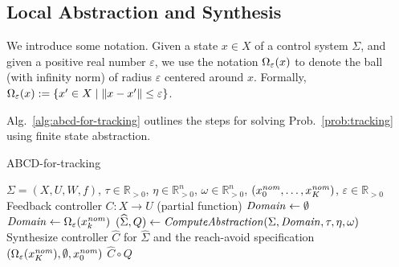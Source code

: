 \subsection{Local Abstraction and Synthesis}

We introduce some notation.
Given a state $x\in X$ of a control system $\Sigma$, and given a positive real number $\varepsilon$, we use the notation $\Omega_\varepsilon(x)$ to denote the ball (with infinity norm) of radius $\varepsilon$ centered around $x$.
Formally, $\Omega_\varepsilon(x):= \{ x'\in X\mid \| x-x' \|\leq \varepsilon \}$.

Alg.~\ref{alg:abcd-for-tracking} outlines the steps for solving Prob.~\ref{prob:tracking} using finite state abstraction.

\begin{algorithm}
	\caption{ABCD-for-tracking}
	\label{alg:abcd-for-tracking}
	\begin{algorithmic}[1]
		\Require $\Sigma=(X,U,W,f)$, $\tau \in \mathbb{R}_{>0}$, $\eta\in \mathbb{R}^n_{>0}$, $\omega\in \mathbb{R}^n_{>0}$, $(x_0^{\mathit{nom}},\ldots,x_K^{\mathit{nom}})$, $\varepsilon \in \mathbb{R}_{>0}$
		\Ensure Feedback controller $C:X\rightarrow U$ (partial function)
		\State $\mathit{Domain}\gets \emptyset$
			\State $\mathit{Domain}\gets \Omega_\varepsilon(x_k^{\mathit{nom}})$
		\EndFor
		\State $(\widehat{\Sigma},Q) \gets \mathit{ComputeAbstraction}(\Sigma, \mathit{Domain}, \tau, \eta, \omega)$
		\State Synthesize controller $\widehat{C}$ for $\widehat{\Sigma}$ and the reach-avoid specification $(\Omega_\varepsilon(x_K^{\mathit{nom}}), \emptyset, x_0^{\mathit{nom}})$
		\State \Return $\widehat{C}\circ Q$
	\end{algorithmic}
\end{algorithm}